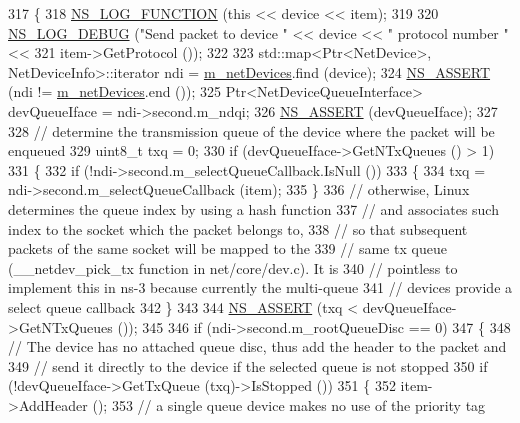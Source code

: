 \begin{DoxyCode}
317 \{
318   \hyperlink{log-macros-disabled_8h_a90b90d5bad1f39cb1b64923ea94c0761}{NS\_LOG\_FUNCTION} (\textcolor{keyword}{this} << device << item);
319 
320   \hyperlink{group__logging_ga413f1886406d49f59a6a0a89b77b4d0a}{NS\_LOG\_DEBUG} (\textcolor{stringliteral}{"Send packet to device "} << device << \textcolor{stringliteral}{" protocol number "} <<
321                 item->GetProtocol ());
322 
323   std::map<Ptr<NetDevice>, NetDeviceInfo>::iterator ndi = \hyperlink{classns3_1_1TrafficControlLayer_a78320d2a2610f730984ca796ed51a495}{m\_netDevices}.find (device);
324   \hyperlink{assert_8h_a6dccdb0de9b252f60088ce281c49d052}{NS\_ASSERT} (ndi != \hyperlink{classns3_1_1TrafficControlLayer_a78320d2a2610f730984ca796ed51a495}{m\_netDevices}.end ());
325   Ptr<NetDeviceQueueInterface> devQueueIface = ndi->second.m\_ndqi;
326   \hyperlink{assert_8h_a6dccdb0de9b252f60088ce281c49d052}{NS\_ASSERT} (devQueueIface);
327 
328   \textcolor{comment}{// determine the transmission queue of the device where the packet will be enqueued}
329   uint8\_t txq = 0;
330   \textcolor{keywordflow}{if} (devQueueIface->GetNTxQueues () > 1)
331     \{
332       \textcolor{keywordflow}{if} (!ndi->second.m\_selectQueueCallback.IsNull ())
333         \{
334           txq = ndi->second.m\_selectQueueCallback (item);
335         \}
336       \textcolor{comment}{// otherwise, Linux determines the queue index by using a hash function}
337       \textcolor{comment}{// and associates such index to the socket which the packet belongs to,}
338       \textcolor{comment}{// so that subsequent packets of the same socket will be mapped to the}
339       \textcolor{comment}{// same tx queue (\_\_netdev\_pick\_tx function in net/core/dev.c). It is}
340       \textcolor{comment}{// pointless to implement this in ns-3 because currently the multi-queue}
341       \textcolor{comment}{// devices provide a select queue callback}
342     \}
343 
344   \hyperlink{assert_8h_a6dccdb0de9b252f60088ce281c49d052}{NS\_ASSERT} (txq < devQueueIface->GetNTxQueues ());
345 
346   \textcolor{keywordflow}{if} (ndi->second.m\_rootQueueDisc == 0)
347     \{
348       \textcolor{comment}{// The device has no attached queue disc, thus add the header to the packet and}
349       \textcolor{comment}{// send it directly to the device if the selected queue is not stopped}
350       \textcolor{keywordflow}{if} (!devQueueIface->GetTxQueue (txq)->IsStopped ())
351         \{
352           item->AddHeader ();
353           \textcolor{comment}{// a single queue device makes no use of the priority tag}

\end{DoxyCode}
